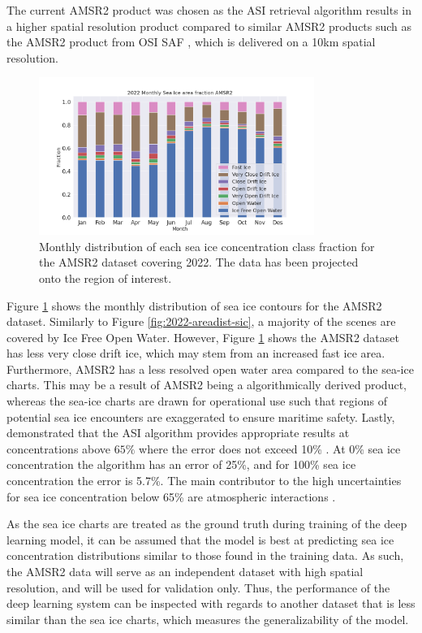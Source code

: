 \documentclass[../main/thesis.tex]{subfiles}
\begin{document}
The current AMSR2 product was chosen as the ASI retrieval algorithm \citep{Spreen2008} results in a higher spatial resolution product compared to similar AMSR2 products such as the AMSR2 product from OSI SAF \citep{Lavelle2016}, which is delivered on a 10km spatial resolution.

\begin{figure}
    \centering
    \includegraphics[width=0.8\textwidth]{2022-sic-distribution_amsr2}
    \caption{\label{fig:dist-amsr2}Monthly distribution of each sea ice concentration class fraction for the AMSR2 dataset covering 2022. The data has been projected onto the region of interest.}
\end{figure}

Figure \ref{fig:dist-amsr2} shows the monthly distribution of sea ice contours for the AMSR2 dataset. Similarly to Figure \ref{fig:2022-areadist-sic}, a majority of the scenes are covered by Ice Free Open Water. However, Figure \ref{fig:dist-amsr2} shows the AMSR2 dataset has less very close drift ice, which may stem from an increased fast ice area. Furthermore, AMSR2 has a less resolved open water area compared to the sea-ice charts. This may be a result of AMSR2 being a algorithmically derived product, whereas the sea-ice charts are drawn for operational use such that regions of potential sea ice encounters are exaggerated to ensure maritime safety. Lastly, \citet{Spreen2008} demonstrated that the ASI algorithm provides appropriate results at concentrations above $65\%$ where the error does not exceed 10\% \citep{Spreen2008}. At 0\% sea ice concentration the algorithm has an error of 25\%, and for 100\% sea ice concentration the error is 5.7\%. The main contributor to the high uncertainties for sea ice concentration below 65\% are atmospheric interactions \citep{Spreen2008}.

As the sea ice charts are treated as the ground truth during training of the deep learning model, it can be assumed that the model is best at predicting sea ice concentration distributions similar to those found in the training data. As such, the AMSR2 data will serve as an independent dataset with high spatial resolution, and will be used for validation only. Thus, the performance of the deep learning system can be inspected with regards to another dataset that is less similar than the sea ice charts, which measures the generalizability of the model.
\end{document}
